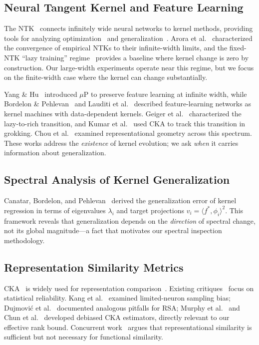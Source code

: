 \documentclass[twoside,11pt]{article}
\begin{document}
\subsection{Neural Tangent Kernel and Feature Learning}

The NTK~\citep{jacot2018neural} connects infinitely wide neural networks to kernel methods, providing tools for analyzing optimization~\citep{du2019neural,allen2019learning} and generalization~\citep{arora2019exact}. Arora et al.~\cite{arora2019exact} characterized the convergence of empirical NTKs to their infinite-width limits, and the fixed-NTK ``lazy training'' regime~\citep{chizat2020lazy} provides a baseline where kernel change is zero by construction. Our large-width experiments operate near this regime, but we focus on the finite-width case where the kernel can change substantially.

Yang \& Hu~\cite{yang2021tensor} introduced $\mu$P to preserve feature learning at infinite width, while Bordelon \& Pehlevan~\cite{bordelon2022spectral,bordelon2023dynamics} and Lauditi et al.~\cite{lauditi2025adaptive} described feature-learning networks as kernel machines with data-dependent kernels. Geiger et al.~\cite{geiger2020scaling} characterized the lazy-to-rich transition, and Kumar et al.~\cite{kumar2024grokking} used CKA to track this transition in grokking. Chou et al.~\cite{chou2025feature} examined representational geometry across this spectrum. These works address the \emph{existence} of kernel evolution; we ask \emph{when} it carries information about generalization.

\subsection{Spectral Analysis of Kernel Generalization}

Canatar, Bordelon, and Pehlevan~\cite{canatar2021spectral} derived the generalization error of kernel regression in terms of eigenvalues $\lambda_{i}$ and target projections $v_{i}=\langle f^{*},\phi_{i}\rangle^{2}$. This framework reveals that generalization depends on the \emph{direction} of spectral change, not its global magnitude---a fact that motivates our spectral inspection methodology.

\subsection{Representation Similarity Metrics}

CKA~\citep{kornblith2019similarity} is widely used for representation comparison~\citep{raghu2017svcca,morcos2018insights,klabunde2023similarity}. Existing critiques~\citep{davari2022reliability,ding2021grounding} focus on statistical reliability. Kang et al.~\cite{kang2025spectral} examined limited-neuron sampling bias; Dujmovi\'c et al.~\cite{dujmovic2025pitfalls} documented analogous pitfalls for RSA; Murphy et al.~\cite{murphy2024cka} and Chun et al.~\cite{chun2025debias} developed debiased CKA estimators, directly relevant to our effective rank bound. Concurrent work~\citep{bridging2026usable} argues that representational similarity is sufficient but not necessary for functional similarity.
\end{document}
